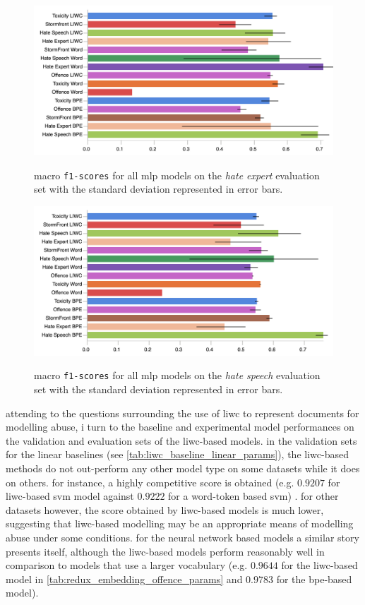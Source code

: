 \begin{figure}
\begin{minipage}{\textwidth}
\centering
    \includegraphics[width=\textwidth]{all_mlp_waseem_test.pdf}
    \caption{macro \texttt{f1-scores} for all mlp models on the \textit{hate expert} evaluation set with the standard deviation represented in error bars.}
    \label{fig:waseem_mlp_test}
    \vfill
      \includegraphics[width=\textwidth]{all_mlp_waseem_hovy_test.pdf}
  \caption{macro \texttt{f1-scores} for all mlp models on the \textit{hate speech} evaluation set with the standard deviation represented in error bars.}
  \label{fig:waseem_hovy_mlp_test}
\end{minipage}
\end{figure}

attending to the questions surrounding the use of liwc to represent documents for modelling abuse, i turn to the baseline and experimental model performances on the validation and evaluation sets of the liwc-based models.
in the validation sets for the linear baselines (see \cref{tab:liwc_baseline_linear_params}), the liwc-based methods do not out-perform any other model type on some datasets while it does on others.
for instance, a highly competitive score is obtained (e.g. $0.9207$ for liwc-based svm model against $0.9222$ for a word-token based svm) .
for other datasets however, the score obtained by liwc-based models is much lower, suggesting that liwc-based modelling may be an appropriate means of modelling abuse under some conditions.
for the neural network based models a similar story presents itself, although the liwc-based models perform reasonably well in comparison to models that use a larger vocabulary (e.g. $0.9644$ for the liwc-based model in \cref{tab:redux_embedding_offence_params} and $0.9783$ for the bpe-based model).

